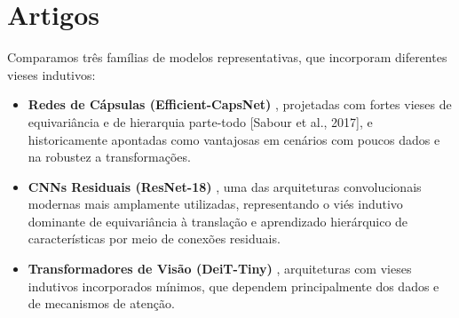
\chapter{Artigos}
\label{cap3}
Comparamos três famílias de modelos representativas, que incorporam diferentes vieses indutivos:

\begin{itemize}
    \item \textbf{Redes de Cápsulas (Efficient-CapsNet)} , projetadas com fortes vieses de equivariância e de hierarquia parte-todo [Sabour et al., 2017], e historicamente apontadas como vantajosas em cenários com poucos dados e na robustez a transformações.

    \item \textbf{CNNs Residuais (ResNet-18)} , uma das arquiteturas convolucionais modernas mais amplamente utilizadas, representando o viés indutivo dominante de equivariância à translação e aprendizado hierárquico de características por meio de conexões residuais.

    \item \textbf{Transformadores de Visão (DeiT-Tiny)} , arquiteturas com vieses indutivos incorporados mínimos, que dependem principalmente dos dados e de mecanismos de atenção.
\end{itemize}
